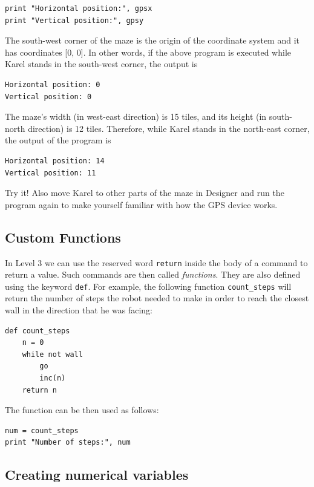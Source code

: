 \begin{verbatim}
print "Horizontal position:", gpsx
print "Vertical position:", gpsy
\end{verbatim}
The south-west corner of the maze is the origin of the coordinate system and it has 
coordinates [0, 0]. In other words, if the above program is executed while Karel stands 
in the south-west corner, the output is

\begin{verbatim}
Horizontal position: 0
Vertical position: 0
\end{verbatim}
The maze's width (in west-east direction) is 15 tiles, and its height (in south-north direction) 
is 12 tiles. Therefore, while Karel stands in the north-east corner, the output of the program is
\begin{verbatim}
Horizontal position: 14
Vertical position: 11
\end{verbatim}
Try it! Also move Karel to other parts of the maze in Designer and run the program again
to make yourself familiar with how the GPS device works.

\subsection{Custom Functions}

In Level 3 we can use the reserved word {\tt return} inside the body of
a command to return a value. Such commands are then called {\em functions}. 
They are also defined using the keyword {\tt def}. For example, the following function
{\tt count\_steps} will return the number of steps the robot needed to 
make in order to reach the closest wall in the direction that he was facing:

\begin{verbatim}
def count_steps
    n = 0
    while not wall
        go
        inc(n)
    return n
\end{verbatim}
The function can be then used as follows:

\begin{verbatim}
num = count_steps
print "Number of steps:", num 
\end{verbatim}

\subsection{Creating numerical variables} \label{par:var}

